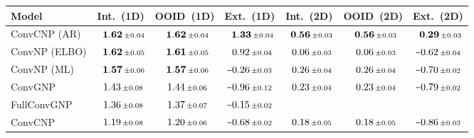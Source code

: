 \begin{tabular}[t]{lcccccc} 
\toprule 
Model & Int.\ (1D) & OOID\ (1D) & Ext.\ (1D) & Int.\ (2D) & OOID\ (2D) & Ext.\ (2D) \\ \midrule 
ConvCNP (AR) & $\hphantom{\scalebox{0.7}[1]{$-$}}\mathbf{1.62}\,{ \scriptstyle \pm  0.04 }$ & $\hphantom{\scalebox{0.7}[1]{$-$}}\mathbf{1.62}\,{ \scriptstyle \pm  0.04 }$ & $\hphantom{\scalebox{0.7}[1]{$-$}}\mathbf{1.33}\,{ \scriptstyle \pm  0.04 }$ & $\hphantom{\scalebox{0.7}[1]{$-$}}\mathbf{0.56}\,{ \scriptstyle \pm  0.03 }$ & $\hphantom{\scalebox{0.7}[1]{$-$}}\mathbf{0.56}\,{ \scriptstyle \pm  0.03 }$ & $\hphantom{\scalebox{0.7}[1]{$-$}}\mathbf{0.29}\,{ \scriptstyle \pm  0.03 }$ \\ 
ConvNP (ELBO) & $\hphantom{\scalebox{0.7}[1]{$-$}}\mathbf{1.62}\,{ \scriptstyle \pm  0.05 }$ & $\hphantom{\scalebox{0.7}[1]{$-$}}\mathbf{1.61}\,{ \scriptstyle \pm  0.05 }$ & $\hphantom{\scalebox{0.7}[1]{$-$}}0.92\,{ \scriptstyle \pm  0.04 }$ & $\hphantom{\scalebox{0.7}[1]{$-$}}0.06\,{ \scriptstyle \pm  0.03 }$ & $\hphantom{\scalebox{0.7}[1]{$-$}}0.06\,{ \scriptstyle \pm  0.03 }$ & $\scalebox{0.7}[1]{$-$}0.62\,{ \scriptstyle \pm  0.04 }$ \\ 
ConvNP (ML) & $\hphantom{\scalebox{0.7}[1]{$-$}}\mathbf{1.57}\,{ \scriptstyle \pm  0.06 }$ & $\hphantom{\scalebox{0.7}[1]{$-$}}\mathbf{1.57}\,{ \scriptstyle \pm  0.06 }$ & $\scalebox{0.7}[1]{$-$}0.26\,{ \scriptstyle \pm  0.03 }$ & $\hphantom{\scalebox{0.7}[1]{$-$}}0.26\,{ \scriptstyle \pm  0.04 }$ & $\hphantom{\scalebox{0.7}[1]{$-$}}0.26\,{ \scriptstyle \pm  0.04 }$ & $\scalebox{0.7}[1]{$-$}0.70\,{ \scriptstyle \pm  0.02 }$ \\ 
ConvGNP & $\hphantom{\scalebox{0.7}[1]{$-$}}1.43\,{ \scriptstyle \pm  0.08 }$ & $\hphantom{\scalebox{0.7}[1]{$-$}}1.44\,{ \scriptstyle \pm  0.06 }$ & $\scalebox{0.7}[1]{$-$}0.96\,{ \scriptstyle \pm  0.12 }$ & $\hphantom{\scalebox{0.7}[1]{$-$}}0.23\,{ \scriptstyle \pm  0.04 }$ & $\hphantom{\scalebox{0.7}[1]{$-$}}0.23\,{ \scriptstyle \pm  0.04 }$ & $\scalebox{0.7}[1]{$-$}0.79\,{ \scriptstyle \pm  0.02 }$ \\ 
FullConvGNP & $\hphantom{\scalebox{0.7}[1]{$-$}}1.36\,{ \scriptstyle \pm  0.08 }$ & $\hphantom{\scalebox{0.7}[1]{$-$}}1.37\,{ \scriptstyle \pm  0.07 }$ & $\scalebox{0.7}[1]{$-$}0.15\,{ \scriptstyle \pm  0.02 }$ &  &  &  \\ 
ConvCNP & $\hphantom{\scalebox{0.7}[1]{$-$}}1.19\,{ \scriptstyle \pm  0.08 }$ & $\hphantom{\scalebox{0.7}[1]{$-$}}1.20\,{ \scriptstyle \pm  0.06 }$ & $\scalebox{0.7}[1]{$-$}0.68\,{ \scriptstyle \pm  0.02 }$ & $\hphantom{\scalebox{0.7}[1]{$-$}}0.18\,{ \scriptstyle \pm  0.05 }$ & $\hphantom{\scalebox{0.7}[1]{$-$}}0.18\,{ \scriptstyle \pm  0.05 }$ & $\scalebox{0.7}[1]{$-$}0.86\,{ \scriptstyle \pm  0.03 }$ \\ 

\end{tabular}
